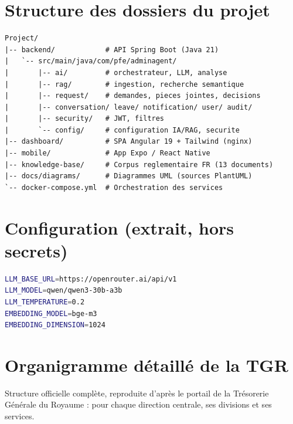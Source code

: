 \documentclass[a4paper,12pt,oneside]{report}
\begin{document}
\section{Structure des dossiers du projet}
\begin{lstlisting}[caption={Arborescence (extrait)}]
Project/
|-- backend/            # API Spring Boot (Java 21)
|   `-- src/main/java/com/pfe/adminagent/
|       |-- ai/         # orchestrateur, LLM, analyse
|       |-- rag/        # ingestion, recherche semantique
|       |-- request/    # demandes, pieces jointes, decisions
|       |-- conversation/ leave/ notification/ user/ audit/
|       |-- security/   # JWT, filtres
|       `-- config/     # configuration IA/RAG, securite
|-- dashboard/          # SPA Angular 19 + Tailwind (nginx)
|-- mobile/             # App Expo / React Native
|-- knowledge-base/     # Corpus reglementaire FR (13 documents)
|-- docs/diagrams/      # Diagrammes UML (sources PlantUML)
`-- docker-compose.yml  # Orchestration des services
\end{lstlisting}

\section{Configuration (extrait, hors secrets)}
\begin{lstlisting}[language=bash,caption={Variables d'environnement principales}]
LLM_BASE_URL=https://openrouter.ai/api/v1
LLM_MODEL=qwen/qwen3-30b-a3b
LLM_TEMPERATURE=0.2
EMBEDDING_MODEL=bge-m3
EMBEDDING_DIMENSION=1024
\end{lstlisting}

\section{Organigramme détaillé de la TGR}
\label{ann:orga}
Structure officielle complète, reproduite d'après le portail de la Trésorerie
Générale du Royaume : pour chaque direction centrale, ses divisions et ses
services.

\newcommand{\dir}[1]{\medskip\noindent{\large\bfseries #1}\par\vspace{2pt}}
\newcommand{\dive}[1]{\smallskip\noindent\textbf{#1}}
\newenvironment{svc}{\begin{itemize}[nosep,leftmargin=1.6em,label=\textperiodcentered]}{\end{itemize}}
\end{document}
